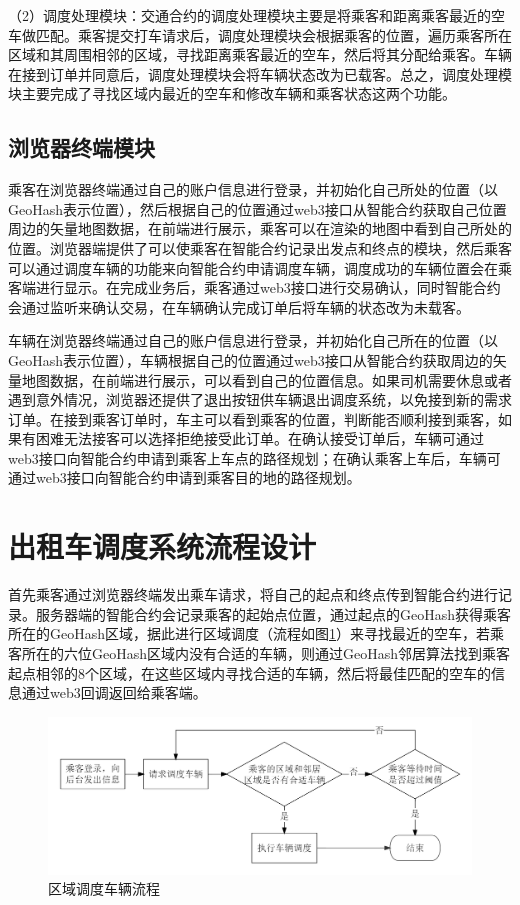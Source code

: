 （2）调度处理模块：交通合约的调度处理模块主要是将乘客和距离乘客最近的空车做匹配。乘客提交打车请求后，调度处理模块会根据乘客的位置，遍历乘客所在区域和其周围相邻的区域，寻找距离乘客最近的空车，然后将其分配给乘客。车辆在接到订单并同意后，调度处理模块会将车辆状态改为已载客。总之，调度处理模块主要完成了寻找区域内最近的空车和修改车辆和乘客状态这两个功能。


\subsection{浏览器终端模块}
乘客在浏览器终端通过自己的账户信息进行登录，并初始化自己所处的位置（以GeoHash表示位置），然后根据自己的位置通过web3接口从智能合约获取自己位置周边的矢量地图数据，在前端进行展示，乘客可以在渲染的地图中看到自己所处的位置。浏览器端提供了可以使乘客在智能合约记录出发点和终点的模块，然后乘客可以通过调度车辆的功能来向智能合约申请调度车辆，调度成功的车辆位置会在乘客端进行显示。在完成业务后，乘客通过web3接口进行交易确认，同时智能合约会通过监听来确认交易，在车辆确认完成订单后将车辆的状态改为未载客。\par

车辆在浏览器终端通过自己的账户信息进行登录，并初始化自己所在的位置（以GeoHash表示位置），车辆根据自己的位置通过web3接口从智能合约获取周边的矢量地图数据，在前端进行展示，可以看到自己的位置信息。如果司机需要休息或者遇到意外情况，浏览器还提供了退出按钮供车辆退出调度系统，以免接到新的需求订单。在接到乘客订单时，车主可以看到乘客的位置，判断能否顺利接到乘客，如果有困难无法接客可以选择拒绝接受此订单。在确认接受订单后，车辆可通过web3接口向智能合约申请到乘客上车点的路径规划；在确认乘客上车后，车辆可通过web3接口向智能合约申请到乘客目的地的路径规划。


\section{出租车调度系统流程设计}
首先乘客通过浏览器终端发出乘车请求，将自己的起点和终点传到智能合约进行记录。服务器端的智能合约会记录乘客的起始点位置，通过起点的GeoHash获得乘客所在的GeoHash区域，据此进行区域调度（流程如图\ref{fig:region}）来寻找最近的空车，若乘客所在的六位GeoHash区域内没有合适的车辆，则通过GeoHash邻居算法找到乘客起点相邻的8个区域，在这些区域内寻找合适的车辆，然后将最佳匹配的空车的信息通过web3回调返回给乘客端。\par

\begin{figure}
  \centering
  \includegraphics[width=1.0\textwidth]{figures/区域调度车辆流程}
  \caption{区域调度车辆流程}\label{fig:region}
\end{figure}

